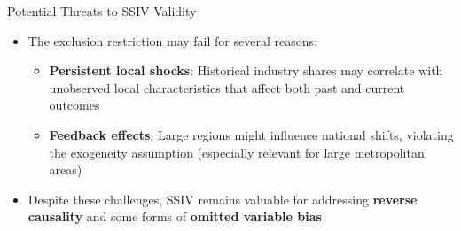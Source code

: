 \documentclass[dvipsnames,hyperref={pdfpagelabels=false}]{beamer}
\begin{document}
\begin{frame}{Potential Threats to SSIV Validity}
	\begin{itemize}
		\item The exclusion restriction may fail for several reasons:
		\vspace{0.2cm}
		\begin{itemize}
			\item \textbf{Persistent local shocks}: Historical industry shares may correlate with unobserved local characteristics that affect both past and current outcomes
			\vspace{0.2cm}
			\item \textbf{Feedback effects}: Large regions might influence national shifts, violating the exogeneity assumption (especially relevant for large metropolitan areas)
			\vspace{0.2cm}
		\end{itemize}
		\vspace{0.3cm}
		\item Despite these challenges, SSIV remains valuable for addressing \textbf{reverse causality} and some forms of \textbf{omitted variable bias}
	\end{itemize}
\end{frame}
\end{document}
